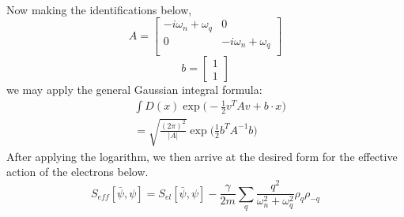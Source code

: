 \documentclass[10pt,a4paper]{article}
\begin{document}
\begin{multicols}{2}
\begin{align*}
\end{align*}\normalsize
Now making the identifications below,
$$
A=\begin{bmatrix}
-i\omega_n + \omega_q & 0 \\
0 & -i\omega_n + \omega_q \\
\end{bmatrix}
$$
$$
b=\begin{bmatrix}
1 \\ 1 
\end{bmatrix}
$$
we may apply the general Gaussian integral formula:
\begin{align*}
&\int D(x) \exp\Big(-\frac{1}{2}v^{T}A v + b\cdot x  \Big)\\
&=\sqrt{\frac{(2\pi)^2}{\vert A\vert}}\exp\Big(\frac{1}{2}b^T  A^{-1}b\Big)
\end{align*}
After applying the logarithm, we then arrive at the desired form for the effective action of the electrons below.
$$
S_{eff}[\bar{\psi},\psi]=S_{el}[\bar{\psi},\psi]-\frac{\gamma}{2m}\sum_{q}\frac{q^2}{\omega_n^2+\omega_q^2}\rho_q\rho_{-q}
$$
\end{multicols}
\end{document}
